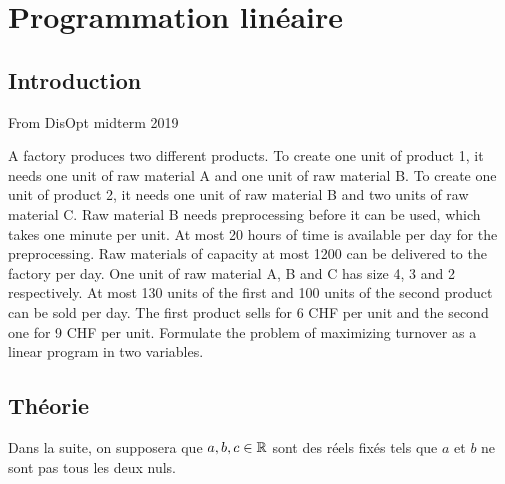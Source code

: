 
\chapter{Programmation linéaire}

\section{Introduction}
	From DisOpt midterm 2019
	
	A factory produces two different products. To create one unit of product 1, it needs one unit of
	raw material A and one unit of raw material B. To create one unit of product 2, it needs one unit
	of raw material B and two units of raw material C. Raw material B needs preprocessing before it
	can be used, which takes one minute per unit. At most 20 hours of time is available per day for
	the preprocessing. Raw materials of capacity at most 1200 can be delivered to the factory per day.
	One unit of raw material A, B and C has size 4, 3 and 2 respectively.
	At most 130 units of the first and 100 units of the second product can be sold per day. The first
	product sells for 6 CHF per unit and the second one for 9 CHF per unit.
	Formulate the problem of maximizing turnover as a linear program in two variables.


\section{Théorie}

Dans la suite, on supposera que $a, b, c\in\mathbb{R}$ sont des réels fixés tels que $a$ et $b$ ne sont pas tous les deux nuls.




